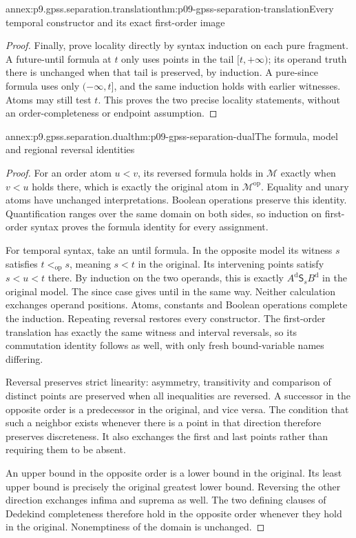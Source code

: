 \begin{annexitem}{annex:p9.gpss.separation.translation}{thm:p09-gpss-separation-translation}{Every temporal constructor and its exact first-order image}
\begin{proof}
Finally, prove locality directly by syntax induction
on each pure fragment. A future-until formula at
\(t\) only uses points in the tail \([t,+\infty)\);
its operand truth there is unchanged when that
tail is preserved, by induction. A pure-since
formula uses only \((-\infty,t]\), and the
same induction holds with earlier witnesses.
Atoms may still test \(t\). This proves the
two precise locality statements, without an
order-completeness or endpoint assumption.
\end{proof}
\end{annexitem}

\begin{annexitem}{annex:p9.gpss.separation.dual}{thm:p09-gpss-separation-dual}{The formula, model and regional reversal identities}
\begin{proof}
For an order atom \(u<v\), its reversed formula
holds in \(\mathcal M\) exactly when \(v<u\)
holds there, which is exactly the original atom
in \(\mathcal M^{\mathrm{op}}\). Equality and
unary atoms have unchanged interpretations.
Boolean operations preserve this identity.
Quantification ranges over the same domain on
both sides, so induction on first-order syntax
proves the formula identity for every assignment.

For temporal syntax, take an until formula.
In the opposite model its witness \(s\) satisfies
\(t<_{\mathrm{op}}s\), meaning \(s<t\) in
the original. Its intervening points satisfy
\(s<u<t\) there. By induction on the two
operands, this is exactly
\(A^{\mathrm d}\mathbin{\mathsf S_s}B^{\mathrm d}\)
in the original model. The since case gives
until in the same way. Neither calculation
exchanges operand positions. Atoms, constants
and Boolean operations complete the induction.
Repeating reversal restores every constructor.
The first-order translation has exactly the
same witness and interval reversals, so its
commutation identity follows as well, with
only fresh bound-variable names differing.

Reversal preserves strict linearity: asymmetry,
transitivity and comparison of distinct points
are preserved when all inequalities are reversed.
A successor in the opposite order is a
predecessor in the original, and vice versa.
The condition that such a neighbor exists
whenever there is a point in that direction
therefore preserves discreteness. It also
exchanges the first and last points rather
than requiring them to be absent.

An upper bound in the opposite order is a
lower bound in the original. Its least
upper bound is precisely the original
greatest lower bound. Reversing the
other direction exchanges infima and
suprema as well. The two defining
clauses of Dedekind completeness
therefore hold in the opposite
order whenever they hold in the
original. Nonemptiness of the
domain is unchanged.


\end{proof}
\end{annexitem}
